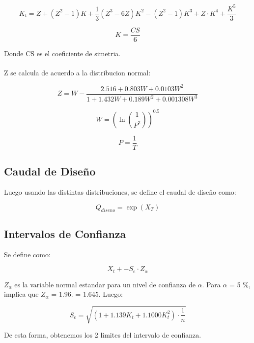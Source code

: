 \begin{equation}
    K_t = Z + (Z^2 - 1)K + \frac{1}{3}(Z^3 - 6Z)K^2 - (Z^2-1)K^3 + Z\cdot K^4 + \frac{K^5}{3}
\end{equation}

\begin{equation}
    K = \frac{CS}{6}
\end{equation}

Donde CS es el coeficiente de simetria.
\\ \\
Z se calcula de acuerdo a la distribucion normal:

\begin{equation}
    Z = W -  \frac{2.516 + 0.803W + 0.0103W^2}{1 + 1.432W + 0.189W^2 + 0.001308W^3}
\end{equation}

\begin{equation}
    W = (\ln(\frac{1}{P^2}))^{0.5}
\end{equation}

\begin{equation}
    P = \frac{1}{T}
\end{equation}

\subsection{Caudal de Diseño}

Luego usando las distintas distribuciones, se define el caudal de diseño como:

\begin{equation}
    Q_{diseno} = \exp(X_T)
\end{equation}

\subsection{Intervalos de Confianza}

Se define como:

\begin{equation}
    X_t + - S_e \cdot Z_{\alpha}
\end{equation}

\textbf{$Z_{\alpha}$} es la variable normal estandar para un nivel de confianza de $\alpha$. Para $\alpha$ = 5 \%, implica que $Z_{\alpha}$ = 1.96. = 1.645. Luego:

\begin{equation}
    S_e = \sqrt{(1+1.139K_t + 1.1000K_t^2) \cdot \frac{1}{n}}
\end{equation}

De esta forma, obtenemos los 2 limites del intervalo de confianza.